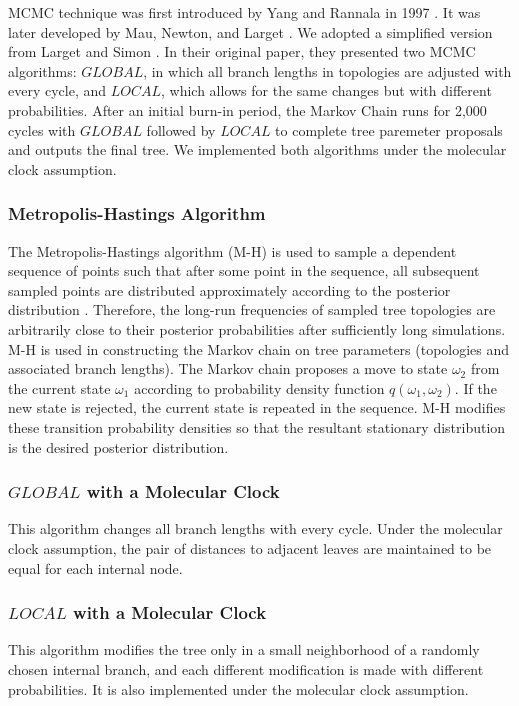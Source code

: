 \documentclass[10pt,twocolumn]{article}
\begin{document}
MCMC technique was first introduced by Yang and Rannala in 1997 \cite{yang1997bayesian}. It was later developed by Mau, Newton, and Larget \cite{mau1999bayesian}. We adopted a simplified version from Larget and Simon \cite{larget1999markov}. In their original paper, they presented two MCMC algorithms: $GLOBAL$, in which all branch lengths in topologies are adjusted with every cycle, and $LOCAL$, which allows for the same changes but with different probabilities. After an initial burn-in period, the Markov Chain runs for 2,000 cycles with $GLOBAL$ followed by $LOCAL$ to complete tree paremeter proposals and outputs the final tree. We implemented both algorithms under the molecular clock assumption.

\subsubsection*{Metropolis-Hastings Algorithm}
The Metropolis-Hastings algorithm (M-H) is used to sample a dependent sequence of points such that after some point in the sequence, all subsequent sampled points are distributed approximately according to the posterior distribution \cite{larget1999markov}. Therefore, the long-run frequencies of sampled tree topologies are arbitrarily close to their posterior probabilities after sufficiently long simulations. M-H is used in constructing the Markov chain on tree parameters (topologies and associated branch lengths). The Markov chain proposes a move to state $\omega_2$ from the current state $\omega_1$ according to probability density function $q(\omega_1,\omega_2)$. If the new state is rejected, the current state is repeated in the sequence. M-H modifies these transition probability densities so that the resultant stationary distribution is the desired posterior distribution.

\subsubsection*{$GLOBAL$ with a Molecular Clock}
This algorithm changes all branch lengths with every cycle. Under the molecular clock assumption, the pair of distances to adjacent leaves are maintained to be equal for each internal node.
\subsubsection*{$LOCAL$ with a Molecular Clock}
This algorithm modifies the tree only in a small neighborhood of a randomly chosen internal branch, and each different modification is made with different probabilities. It is also implemented under the molecular clock assumption.
\end{document}
